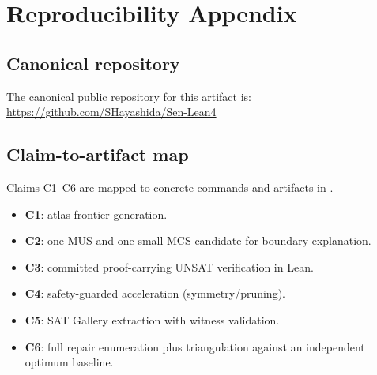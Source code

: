 \section{Reproducibility Appendix}

\subsection{Canonical repository}
The canonical public repository for this artifact is:
\url{https://github.com/SHayashida/Sen-Lean4}

\subsection{Claim-to-artifact map}
Claims C1--C6 are mapped to concrete commands and artifacts in .

\begin{itemize}[leftmargin=*]
  \item \textbf{C1}: atlas frontier generation.
  \item \textbf{C2}: one MUS and one small MCS candidate for boundary explanation.
  \item \textbf{C3}: committed proof-carrying UNSAT verification in Lean.
  \item \textbf{C4}: safety-guarded acceleration (symmetry/pruning).
  \item \textbf{C5}: SAT Gallery extraction with witness validation.
  \item \textbf{C6}: full repair enumeration plus triangulation against an independent optimum baseline.
\end{itemize}

